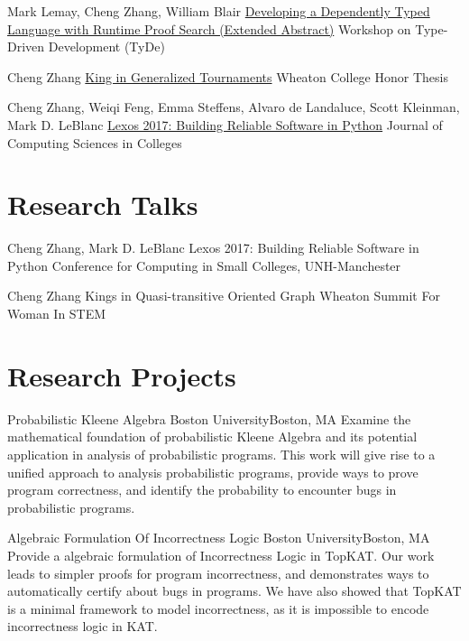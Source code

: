 \documentclass[11pt,roman]{moderncv}        %
\begin{document}
{Mark Lemay, Cheng Zhang, William Blair}
{\href{https://icfp20.sigplan.org/details/tyde-2020-papers/7/Developing-a-Dependently-Typed-Language-with-Runtime-Proof-Search-Extended-Abstract-}
{Developing a Dependently Typed Language with Runtime Proof Search (Extended Abstract)}}
{Workshop on Type-Driven Development (TyDe)}
{}{}

{Cheng Zhang}
{\href{http://hdl.handle.net/11040/24570}{King in Generalized Tournaments}}
{Wheaton College Honor Thesis}
{}{}

{Cheng Zhang, Weiqi Feng, Emma Steffens, Alvaro de Landaluce, Scott Kleinman, Mark D. LeBlanc}
{\href{https://dl.acm.org/doi/10.5555/3205191.3205205}{Lexos 2017: Building Reliable Software in Python}}
{Journal of Computing Sciences in Colleges}
{}{}


\section{Research Talks}

{Cheng Zhang, Mark D. LeBlanc}
{Lexos 2017: Building Reliable Software in Python}
{Conference for Computing in Small Colleges, UNH-Manchester}
{}{}

{Cheng Zhang}
{Kings in Quasi-transitive Oriented Graph}
{Wheaton Summit For Woman In STEM}
{}{}


\section{Research Projects}

{Probabilistic Kleene Algebra}
{Boston University}{Boston, MA}{}
{Examine the mathematical foundation of probabilistic Kleene Algebra 
and its potential application in analysis of probabilistic programs.
This work will give rise to a unified approach to analysis probabilistic programs,
provide ways to prove program correctness, 
and identify the probability to encounter bugs in probabilistic programs.}

{Algebraic Formulation Of Incorrectness Logic}
{Boston University}{Boston, MA}{}
{Provide a algebraic formulation of Incorrectness Logic in TopKAT.
Our work leads to simpler proofs for program incorrectness, 
and demonstrates ways to automatically certify about bugs in programs.
We have also showed that TopKAT is a minimal framework to model incorrectness,
as it is impossible to encode incorrectness logic in KAT.
}
\end{document}
